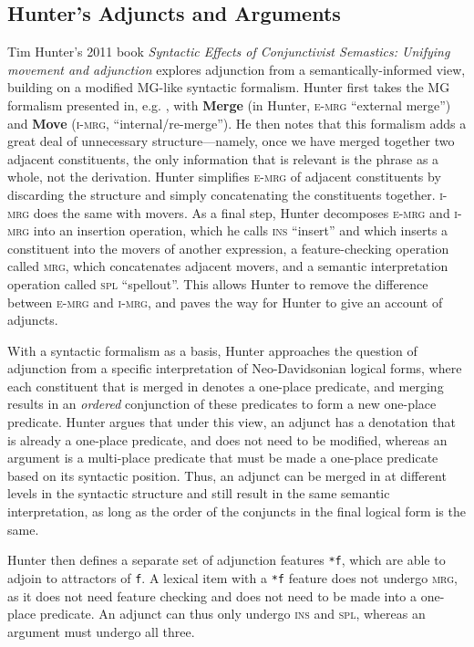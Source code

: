 \documentclass{article}
\begin{document}
\subsection{Hunter's Adjuncts and Arguments}
\label{sec:hunter-adjuncts}

Tim Hunter's 2011 book \textit{Syntactic Effects of Conjunctivist
  Semastics: Unifying movement and adjunction} \cite{hunter2011}
explores adjunction from a semantically-informed view, building on a
modified MG-like syntactic formalism.  Hunter first takes the MG
formalism presented in, e.g. \cite{stabler2001}, with \textbf{Merge}
(in Hunter, \textsc{e-mrg} ``external merge'') and \textbf{Move}
(\textsc{i-mrg}, ``internal/re-merge'').  He then notes that this
formalism adds a great deal of unnecessary structure---namely, once we
have merged together two adjacent constituents, the only information
that is relevant is the phrase as a whole, not the derivation.  Hunter
simplifies \textsc{e-mrg} of adjacent constituents by discarding the
structure and simply concatenating the constituents together.
\textsc{i-mrg} does the same with movers.  As a final step, Hunter
decomposes \textsc{e-mrg} and \textsc{i-mrg} into an insertion
operation, which he calls \textsc{ins} ``insert'' and which inserts a
constituent into the movers of another expression, a feature-checking
operation called \textsc{mrg}, which concatenates adjacent movers, and
a semantic interpretation operation called \textsc{spl} ``spellout''.
This allows Hunter to remove the difference between \textsc{e-mrg} and
\textsc{i-mrg}, and paves the way for Hunter to give an account of
adjuncts.

With a syntactic formalism as a basis, Hunter approaches the question
of adjunction from a specific interpretation of Neo-Davidsonian
logical forms, where each constituent that is merged in denotes a
one-place predicate, and merging results in an \emph{ordered}
conjunction of these predicates to form a new one-place predicate.
Hunter argues that under this view, an adjunct has a denotation that
is already a one-place predicate, and does not need to be modified,
whereas an argument is a multi-place predicate that must be made a
one-place predicate based on its syntactic position.  Thus, an adjunct
can be merged in at different levels in the syntactic structure and
still result in the same semantic interpretation, as long as the order
of the conjuncts in the final logical form is the same.

Hunter then defines a separate set of adjunction features \texttt{*f},
which are able to adjoin to attractors of \texttt{f}.  A lexical item
with a \texttt{*f} feature does not undergo \textsc{mrg}, as it does
not need feature checking and does not need to be made into a
one-place predicate.  An adjunct can thus only undergo \textsc{ins}
and \textsc{spl}, whereas an argument must undergo all three.
\end{document}
